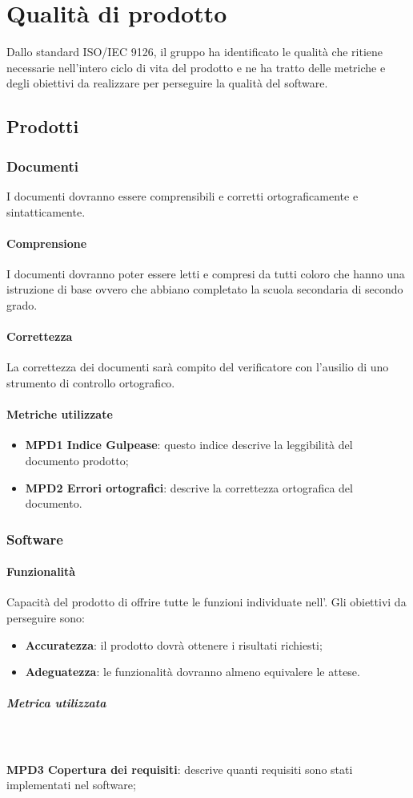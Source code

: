 \section{Qualità di prodotto}
Dallo standard ISO/IEC 9126, il gruppo \Gruppo ha identificato le qualità che ritiene necessarie nell'intero ciclo di vita del prodotto e ne ha tratto delle metriche e degli obiettivi da realizzare per perseguire la qualità del software. 
\subsection{Prodotti}
\subsubsection{Documenti}
I documenti dovranno essere comprensibili e corretti ortograficamente e sintatticamente.
\paragraph{Comprensione}
I documenti dovranno poter essere letti e compresi da tutti coloro che hanno una istruzione di base ovvero che abbiano completato la scuola secondaria di secondo grado.
\paragraph{Correttezza}
La correttezza dei documenti sarà compito del verificatore con l'ausilio di uno strumento di controllo ortografico.
\paragraph{Metriche utilizzate}
\begin{itemize}
\item \textbf{MPD1 Indice Gulpease}: questo indice descrive la leggibilità del documento prodotto;
\item \textbf{MPD2 Errori ortografici}: descrive la correttezza ortografica del documento.
\end{itemize} 
\subsubsection{Software}
\paragraph{Funzionalità}
Capacità del prodotto di offrire tutte le funzioni individuate nell'\AdR{}. Gli obiettivi da perseguire sono:
\begin{itemize}
\item \textbf{Accuratezza}: il prodotto dovrà ottenere i risultati richiesti;
\item \textbf{Adeguatezza}: le funzionalità dovranno almeno equivalere le attese.
\end{itemize}
\subparagraph{Metrica utilizzata}\mbox{}\\
\\
\textbf{MPD3 Copertura dei requisiti}: descrive quanti requisiti sono stati implementati nel software;

